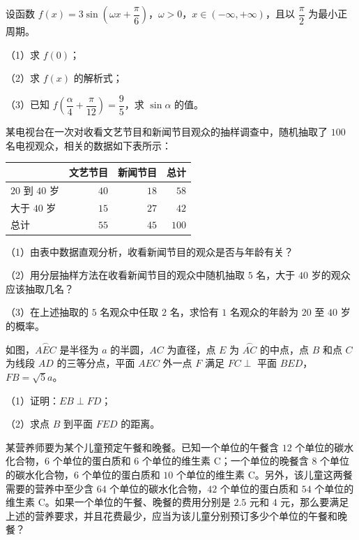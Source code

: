 \begin{question}
设函数 $f(x)=3\sin\left(\omega x+\dfrac\pi6\right)$，$\omega>0$，$x\in(-\infty,+\infty)$，且以 $\dfrac\pi2$ 为最小正周期。

（1）求 $f(0)$；

（2）求 $f(x)$ 的解析式；

（3）已知 $f\left(\dfrac\alpha4+\dfrac\pi{12}\right)=\dfrac95$，求 $\sin\alpha$ 的值。

\end{question}
\begin{question}
某电视台在一次对收看文艺节目和新闻节目观众的抽样调查中，随机抽取了 $100$ 名电视观众，相关的数据如下表所示：

\begin{center}
\begin{tabular}{lrrr}
\toprule
 & 文艺节目 & 新闻节目 & 总计 \\
\midrule
$20$ 到 $40$ 岁 & $40$ & $18$ & $58$ \\
大于 $40$ 岁 & $15$ & $27$ & $42$ \\
总计 & $55$ & $45$ & $100$ \\
\bottomrule
\end{tabular}
\end{center}

（1）由表中数据直观分析，收看新闻节目的观众是否与年龄有关？

（2）用分层抽样方法在收看新闻节目的观众中随机抽取 $5$ 名，大于 $40$ 岁的观众应该抽取几名？

（3）在上述抽取的 $5$ 名观众中任取 $2$ 名，求恰有 $1$ 名观众的年龄为 $20$ 至 $40$ 岁的概率。

\Needspace{0.4\textheight}
\end{question}
\begingroup
\renewenvironment{question}{\Needspace{0.5\textheight}}{}
\begin{question}
如图，$\overset{\frown}{AEC}$ 是半径为 $a$ 的半圆，$AC$ 为直径，点 $E$ 为 $\overset{\frown}{AC}$ 的中点，点 $B$ 和点 $C$ 为线段 $AD$ 的三等分点，平面 $AEC$ 外一点 $F$ 满足 $FC\perp$ 平面 $BED$，$FB=\sqrt5a$。

（1）证明：$EB\perp FD$；

（2）求点 $B$ 到平面 $FED$ 的距离。
\nopagebreak[4]
\begin{center}\end{center}
\nopagebreak[4]
\end{question}
\endgroup
\begin{question}
某营养师要为某个儿童预定午餐和晚餐。已知一个单位的午餐含 $12$ 个单位的碳水化合物，$6$ 个单位的蛋白质和 $6$ 个单位的维生素 C；一个单位的晚餐含 $8$ 个单位的碳水化合物，$6$ 个单位的蛋白质和 $10$ 个单位的维生素 C。另外，该儿童这两餐需要的营养中至少含 $64$ 个单位的碳水化合物，$42$ 个单位的蛋白质和 $54$ 个单位的维生素 C。如果一个单位的午餐、晚餐的费用分别是 $2.5$ 元和 $4$ 元，那么要满足上述的营养要求，并且花费最少，应当为该儿童分别预订多少个单位的午餐和晚餐？

\end{question}
